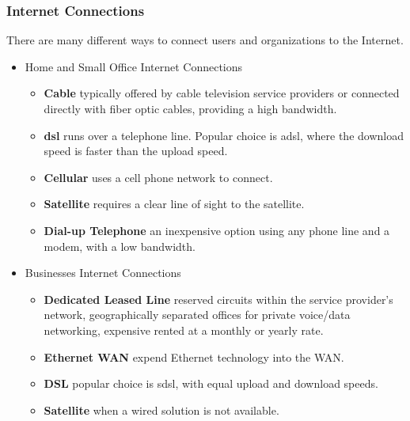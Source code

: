 \documentclass[crop=false]{standalone}
\begin{document}
\subsubsection{Internet Connections}
There are many different ways to connect users and organizations to the Internet.
\begin{itemize}
  \item Home and Small Office Internet Connections
    \begin{itemize}
      \item \textbf{Cable} \hspace{5mm}typically offered by cable television service providers or connected directly with fiber optic cables, providing a high bandwidth.
      \item \textbf{\acrfull{dsl}} \hspace{5mm}runs over a telephone line. Popular choice is \acrfull{adsl}, where the download speed is faster than the upload speed.
      \item \textbf{Cellular} \hspace{5mm}uses a cell phone network to connect.
      \item \textbf{Satellite} \hspace{5mm}requires a clear line of sight to the satellite.
      \item \textbf{Dial-up Telephone} \hspace{5mm}an inexpensive option using any phone line and a modem, with a low bandwidth. 
    \end{itemize}
  \item Businesses Internet Connections
    \begin{itemize}
      \item \textbf{Dedicated Leased Line} \hspace{5mm}reserved circuits within the service provider's network, geographically separated offices for private voice/data networking, expensive rented at a monthly or yearly rate.
      \item \textbf{Ethernet WAN} \hspace{5mm}expend Ethernet technology into the WAN.
      \item \textbf{DSL} \hspace{5mm}popular choice is \acrfull{sdsl}, with equal upload and download speeds.
      \item \textbf{Satellite} \hspace{5mm}when a wired solution is not available.
    \end{itemize}
\end{itemize}
\end{document}
